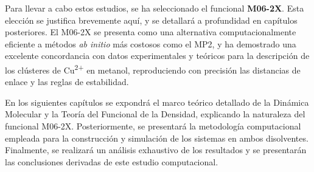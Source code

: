 Para llevar a cabo estos estudios, se ha seleccionado el funcional \textbf{M06-2X}. Esta elección se justifica brevemente aquí, y se detallará a profundidad en capítulos posteriores. El M06-2X se presenta como una alternativa computacionalmente eficiente a métodos \textit{ab initio} más costosos como el MP2, y ha demostrado una excelente concordancia con datos experimentales y teóricos para la descripción de los clústeres de Cu\textsuperscript{2+} en metanol, reproduciendo con precisión las distancias de enlace y las reglas de estabilidad.

En los siguientes capítulos se expondrá el marco teórico detallado de la Dinámica Molecular y la Teoría del Funcional de la Densidad, explicando la naturaleza del funcional M06-2X. Posteriormente, se presentará la metodología computacional empleada para la construcción y simulación de los sistemas en ambos disolventes. Finalmente, se realizará un análisis exhaustivo de los resultados y se presentarán las conclusiones derivadas de este estudio computacional.

